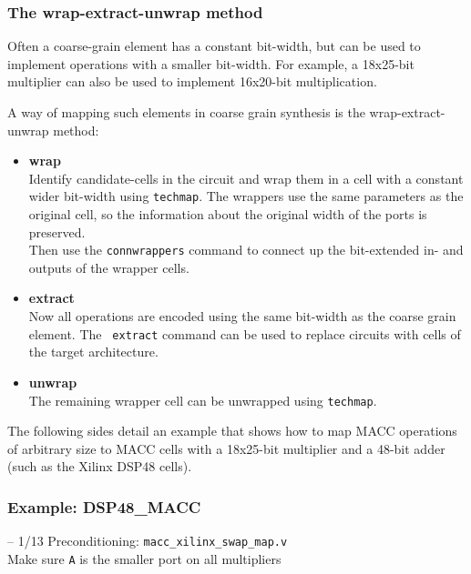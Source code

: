 \subsubsection{The wrap-extract-unwrap method}

\begin{frame}{\subsubsecname}
\scriptsize
Often a coarse-grain element has a constant bit-width, but can be used to
implement operations with a smaller bit-width. For example, a 18x25-bit multiplier
can also be used to implement 16x20-bit multiplication.

\bigskip
A way of mapping such elements in coarse grain synthesis is the wrap-extract-unwrap method:

\begin{itemize}
\item {\bf wrap} \\
Identify candidate-cells in the circuit and wrap them in a cell with a constant
wider bit-width using {\tt techmap}. The wrappers use the same parameters as the original cell, so
the information about the original width of the ports is preserved. \\
Then use the {\tt connwrappers} command to connect up the bit-extended in- and
outputs of the wrapper cells.
\item {\bf extract} \\
Now all operations are encoded using the same bit-width as the coarse grain element. The {\tt
extract} command can be used to replace circuits with cells of the target architecture.
\item {\bf unwrap} \\
The remaining wrapper cell can be unwrapped using {\tt techmap}.
\end{itemize}

\bigskip
The following sides detail an example that shows how to map MACC operations of
arbitrary size to MACC cells with a 18x25-bit multiplier and a 48-bit adder (such as
the Xilinx DSP48 cells).
\end{frame}

\subsubsection{Example: DSP48\_MACC}

\begin{frame}[t, fragile]{\subsubsecname{} -- 1/13}
Preconditioning: {\tt macc\_xilinx\_swap\_map.v} \\
Make sure {\tt A} is the smaller port on all multipliers

\begin{columns}
\column{5cm}

\column{5cm}

\end{columns}
\end{frame}

